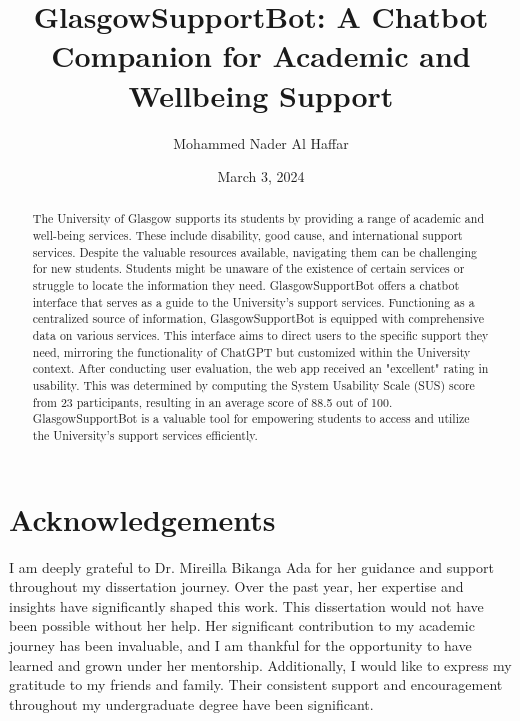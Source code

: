 \documentclass{l4proj}
\begin{document}
\title{GlasgowSupportBot: A Chatbot Companion for Academic and Wellbeing Support}
\author{Mohammed Nader Al Haffar}
\date{March 3, 2024}

\maketitle

\begin{abstract}
The University of Glasgow supports its students by providing a range of academic and well-being services. These include disability, good cause, and international support services. Despite the valuable resources available, navigating them can be challenging for new students. Students might be unaware of the existence of certain services or struggle to locate the information they need. GlasgowSupportBot offers a chatbot interface that serves as a guide to the University's support services. Functioning as a centralized source of information, GlasgowSupportBot is equipped with comprehensive data on various services. This interface aims to direct users to the specific support they need, mirroring the functionality of ChatGPT but customized within the University context. After conducting user evaluation, the web app received an "excellent" rating in usability. This was determined by computing the System Usability Scale (SUS) score from 23 participants, resulting in an average score of 88.5 out of 100. GlasgowSupportBot is a valuable tool for empowering students to access and utilize the University's support services efficiently.
\end{abstract}


\chapter*{Acknowledgements}
I am deeply grateful to Dr. Mireilla Bikanga Ada for her guidance and support throughout my dissertation journey. Over the past year, her expertise and insights have significantly shaped this work. This dissertation would not have been possible without her help. Her significant contribution to my academic journey has been invaluable, and I am thankful for the opportunity to have learned and grown under her mentorship.
Additionally, I would like to express my gratitude to my friends and family. Their consistent support and encouragement throughout my undergraduate degree have been significant.
\end{document}
